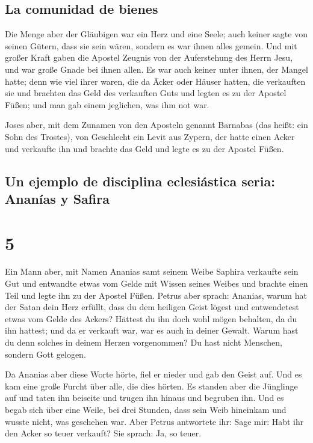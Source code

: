 \hypertarget{la-comunidad-de-bienes}{%
\subsection{La comunidad de bienes}\label{la-comunidad-de-bienes}}

 Die Menge aber der Gläubigen war ein Herz und eine
Seele; auch keiner sagte von seinen Gütern, dass sie sein wären, sondern
es war ihnen alles gemein.  Und mit großer Kraft gaben
die Apostel Zeugnis von der Auferstehung des Herrn Jesu, und war große
Gnade bei ihnen allen.  Es war auch keiner unter ihnen,
der Mangel hatte; denn wie viel ihrer waren, die da Äcker oder Häuser
hatten, die verkauften sie und brachten das Geld des verkauften Guts
 und legten es zu der Apostel Füßen; und man gab einem
jeglichen, was ihm not war.

 Joses aber, mit dem Zunamen von den Aposteln genannt
Barnabas (das heißt: ein Sohn des Trostes), von Geschlecht ein Levit aus
Zypern,  der hatte einen Acker und verkaufte ihn und
brachte das Geld und legte es zu der Apostel Füßen.

\hypertarget{un-ejemplo-de-disciplina-eclesiuxe1stica-seria-ananuxedas-y-safira}{%
\subsection{Un ejemplo de disciplina eclesiástica seria: Ananías y
Safira}\label{un-ejemplo-de-disciplina-eclesiuxe1stica-seria-ananuxedas-y-safira}}

\hypertarget{section-4}{%
\section{5}\label{section-4}}

 Ein Mann aber, mit Namen Ananias samt seinem Weibe
Saphira verkaufte sein Gut  und entwandte etwas vom Gelde
mit Wissen seines Weibes und brachte einen Teil und legte ihn zu der
Apostel Füßen.  Petrus aber sprach: Ananias, warum hat der
Satan dein Herz erfüllt, dass du dem heiligen Geist lögest und
entwendetest etwas vom Gelde des Ackers?  Hättest du ihn
doch wohl mögen behalten, da du ihn hattest; und da er verkauft war, war
es auch in deiner Gewalt. Warum hast du denn solches in deinem Herzen
vorgenommen? Du hast nicht Menschen, sondern Gott gelogen.

 Da Ananias aber diese Worte hörte, fiel er nieder und gab
den Geist auf. Und es kam eine große Furcht über alle, die dies hörten.
 Es standen aber die Jünglinge auf und taten ihn beiseite
und trugen ihn hinaus und begruben ihn.  Und es begab sich
über eine Weile, bei drei Stunden, dass sein Weib hineinkam und wusste
nicht, was geschehen war.  Aber Petrus antwortete ihr:
Sage mir: Habt ihr den Acker so teuer verkauft? Sie sprach: Ja, so
teuer.

